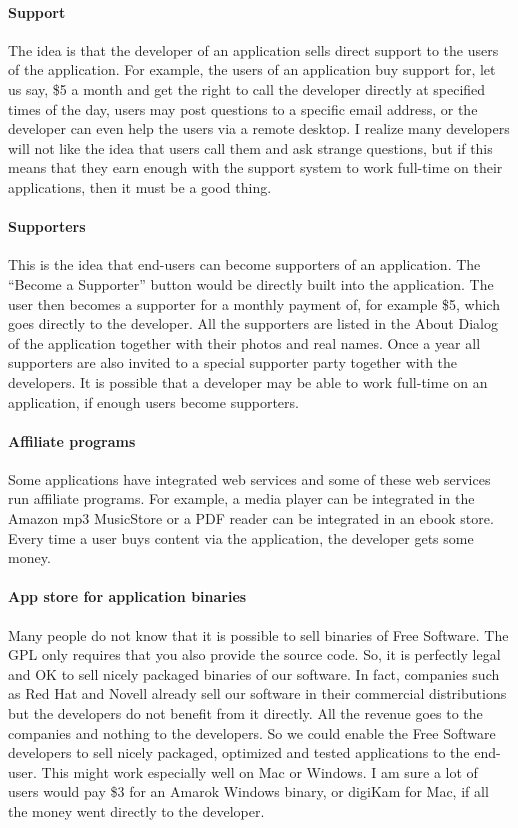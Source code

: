 \paragraph*{Support}

The idea is that the developer of an application sells direct support to the
users of the application. For example, the users of an application buy support
for, let us say, \$5 a month and get the right to call the developer directly at
specified times of the day, users may post questions to a specific email
address, or the developer can even help the users via a remote desktop. I
realize many developers will not like the idea that users call them and ask
strange questions, but if this means that they earn enough with the support
system to work full-time on their applications, then it must be a good thing.

\paragraph*{Supporters}

This is the idea that end-users can become supporters of an application. The
``Become a Supporter'' button would be directly built into the application. The
user then becomes a supporter for a monthly payment of, for example \$5, which
goes directly to the developer. All the supporters are listed in the About
Dialog of the application together with their photos and real names. Once a year
all supporters are also invited to a special supporter party together with the
developers. It is possible that a developer may be able to work full-time on an
application, if enough users become supporters.

\paragraph*{Affiliate programs}

Some applications have integrated web services and some of these web services
run affiliate programs. For example, a media player can be integrated in the
Amazon mp3 MusicStore or a PDF reader can be integrated in an ebook store.
Every time a user buys content via the application, the developer gets some
money.

\paragraph*{App store for application binaries}

Many people do not know that it is possible to sell binaries of Free Software.
The GPL only requires that you also provide the source code. So, it is perfectly
legal and OK to sell nicely packaged binaries of our software. In fact,
companies such as Red Hat and Novell already sell our software in their commercial distributions but the developers do not benefit from it directly. All the revenue goes to the companies and nothing to the developers. So we could enable the Free Software developers to sell nicely packaged, optimized and
tested applications to the end-user. This might work especially well on Mac or
Windows. I am sure a lot of users would pay \$3 for an Amarok Windows binary, or
digiKam for Mac, if all the money went directly to the developer.

